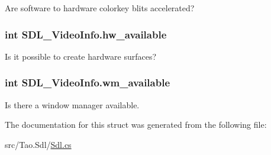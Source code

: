 Are software to hardware colorkey blits accelerated? 

\hypertarget{struct_s_d_l___video_info_a9e3e927ca8f916e256e6e15ded8a2208}{
\subsubsection[{hw\_\-available}]{\setlength{\rightskip}{0pt plus 5cm}int SDL\_\-VideoInfo.hw\_\-available}}
\label{struct_s_d_l___video_info_a9e3e927ca8f916e256e6e15ded8a2208}


Is it possible to create hardware surfaces? 

\hypertarget{struct_s_d_l___video_info_a1a0d117972bfc104ac9f70becb224b76}{
\subsubsection[{wm\_\-available}]{\setlength{\rightskip}{0pt plus 5cm}int SDL\_\-VideoInfo.wm\_\-available}}
\label{struct_s_d_l___video_info_a1a0d117972bfc104ac9f70becb224b76}


Is there a window manager available. 



The documentation for this struct was generated from the following file:\begin{DoxyCompactItemize}
\item 
src/Tao.Sdl/\hyperlink{_sdl_8cs}{Sdl.cs}\end{DoxyCompactItemize}
